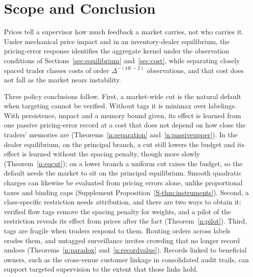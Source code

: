 \documentclass[11pt,letterpaper]{article}
\theoremstyle{definition}
\begin{document}
\section{Scope and Conclusion}\label{sec:conclusion}

Prices tell a supervisor how much feedback a market carries, not who carries it. Under mechanical price impact and in an inventory-dealer equilibrium, the pricing-error response identifies the aggregate kernel under the observation conditions of Sections~\ref{sec:equilibrium} and~\ref{sec:cost}, while separating closely spaced trader classes costs of order $\Delta^{-(4K-2)}$ observations, and that cost does not fall as the market nears instability.

Three policy conclusions follow. First, a market-wide cut is the natural default when targeting cannot be verified. Without tags it is minimax over labelings. With persistence, impact and a memory bound given, its effect is learned from one passive pricing-error record at a cost that does not depend on how close the traders' memories are (Theorems~\ref{n:separation} and~\ref{n:passiveupper}). In the dealer equilibrium, on the principal branch, a cut still lowers the budget and its effect is learned without the spacing penalty, though more slowly (Theorem~\ref{n:eqcut}); on a lower branch a uniform cut raises the budget, so the default needs the market to sit on the principal equilibrium. Smooth quadratic charges can likewise be evaluated from pricing errors alone, unlike proportional taxes and binding caps (Supplement Proposition~\ref{S-thm:instruments}). Second, a class-specific restriction needs attribution, and there are two ways to obtain it: verified flow tags remove the spacing penalty for weights, and a pilot of the restriction reveals its effect from prices after the fact (Theorem~\ref{n:pilot}). Third, tags are fragile when traders respond to them. Routing orders across labels erodes them, and untagged surveillance invites crowding that no longer record undoes (Theorems~\ref{n:paradox} and~\ref{n:recordvalue}). Records linked to beneficial owners, such as the cross-venue customer linkage in consolidated audit trails, can support targeted supervision to the extent that those links hold.
\end{document}
